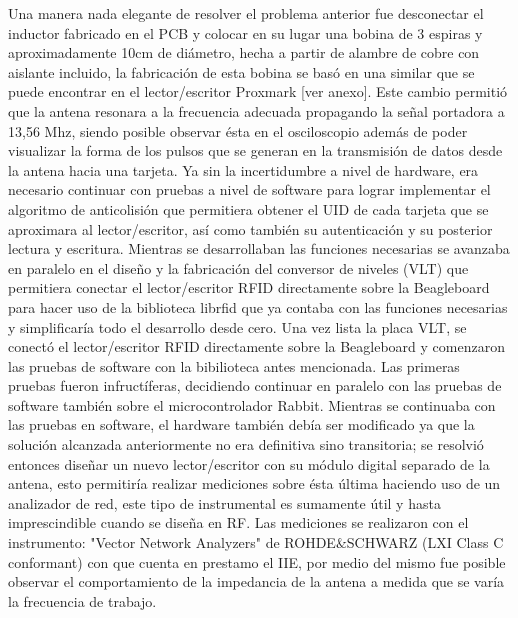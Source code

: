 Una manera nada elegante de resolver el problema anterior fue desconectar el inductor fabricado en el PCB y colocar en su lugar una bobina de 3 espiras y aproximadamente 10cm de diámetro, hecha a partir de alambre de cobre con aislante incluido,  la fabricación de esta bobina se basó en una similar que se puede encontrar en el lector/escritor Proxmark [ver anexo]. Este cambio permitió que la antena resonara a la frecuencia adecuada propagando la señal portadora a 13,56 Mhz, siendo posible observar ésta en el osciloscopio además de poder visualizar la forma de los pulsos que se generan en la transmisión de datos desde la antena hacia una tarjeta.
Ya sin la incertidumbre a nivel de hardware, era necesario continuar con pruebas a nivel de software para lograr implementar el algoritmo de anticolisión que permitiera obtener el UID de cada tarjeta que se aproximara al lector/escritor, así como también su autenticación y su posterior lectura y escritura. Mientras se desarrollaban las funciones necesarias se avanzaba en paralelo en el diseño y la fabricación del conversor de niveles (VLT) que permitiera conectar el lector/escritor RFID directamente sobre la Beagleboard para hacer uso de la biblioteca librfid que ya contaba con las funciones necesarias y simplificaría todo el desarrollo desde cero.
Una vez lista la placa VLT, se conectó el lector/escritor RFID directamente sobre la Beagleboard y comenzaron las pruebas de software con la bibilioteca antes mencionada. Las primeras pruebas fueron infructíferas, decidiendo continuar en paralelo con las pruebas de software también sobre el microcontrolador Rabbit. 
Mientras se continuaba con las pruebas en software, el hardware también debía ser modificado ya que la solución alcanzada anteriormente no era definitiva sino transitoria; se resolvió entonces diseñar un nuevo lector/escritor con su módulo digital separado de la antena, esto permitiría realizar mediciones sobre ésta última haciendo uso de un analizador de red, este tipo de instrumental es sumamente útil y hasta imprescindible cuando se diseña en RF.
Las mediciones se realizaron con el instrumento: "Vector Network Analyzers" de 
ROHDE$\&$SCHWARZ (LXI Class C conformant) con que cuenta en prestamo el IIE, por medio del mismo fue posible observar el comportamiento de la impedancia de la antena a medida que se varía la frecuencia de trabajo.
